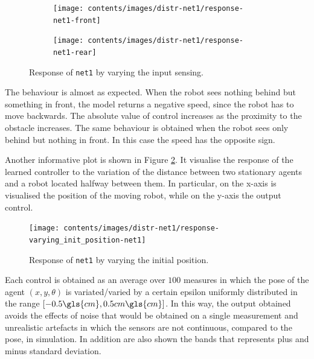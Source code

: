 \begin{figure}[!htb]
	\centering
	\begin{subfigure}[h]{0.49\textwidth}
		\centering
		\texttt{[image: contents/images/distr-net1/response-net1-front]}%
	\end{subfigure}
	\hfill
	\begin{subfigure}[h]{0.49\textwidth}
		\centering
		\texttt{[image: contents/images/distr-net1/response-net1-rear]}
	\end{subfigure}
	\caption[Response of \texttt{net1} by varying the input sensing.]{Response of 
	\texttt{net1} by varying the input sensing.}
	\label{fig:net1responsesensors}
\end{figure}

The behaviour is almost as expected. When the robot sees nothing behind but 
something in front, the model returns a negative speed, since the robot has to 
move backwards. 
The absolute value of control increases as the proximity to the obstacle increases.
The same behaviour is obtained when the robot sees only behind but nothing in 
front. In this case the speed has the opposite sign.

Another informative plot is shown in Figure \ref{fig:net1responseposition}. It 
visualise the response of the learned controller to the variation of the distance 
between two stationary agents and a robot located halfway between them.
In particular, on the x-axis is visualised the position of the moving robot, while on 
the y-axis the output control.

\begin{figure}[!htb]
	\centering
	\texttt{[image: contents/images/distr-net1/response-varying\_init\_position-net1]}%
	\caption{Response of \texttt{net1} by varying the initial position.}
	\label{fig:net1responseposition}
\end{figure}

Each control is obtained as an average over $100$ measures in which the pose of 
the agent $(x, y, \theta)$ is variated/varied by a certain epsilon uniformly 
distributed in the range $[-0.5\gls{cm}, 0.5cm\gls{cm}]$. In this way, the output 
obtained avoids the effects of noise that would be obtained on a single 
measurement and unrealistic artefacts in which the sensors are not continuous, 
compared to the pose, in simulation. In addition are also shown the bands that 
represents plus and minus standard deviation.

